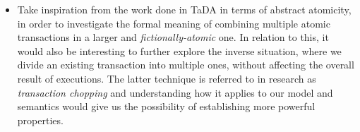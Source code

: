 \begin{itemize}
	\item Take inspiration from the work done in TaDA \cite{tada} in terms of abstract atomicity, in order to investigate the formal meaning of combining multiple atomic transactions in a larger and \textit{fictionally-atomic} one. In relation to this, it would also be interesting to further explore the inverse situation, where we divide an existing transaction into multiple ones, without affecting the overall result of executions. The latter technique is referred to in research as \textit{transaction chopping} and understanding how it applies to our model and semantics would give us the possibility of establishing more powerful properties.
\end{itemize}